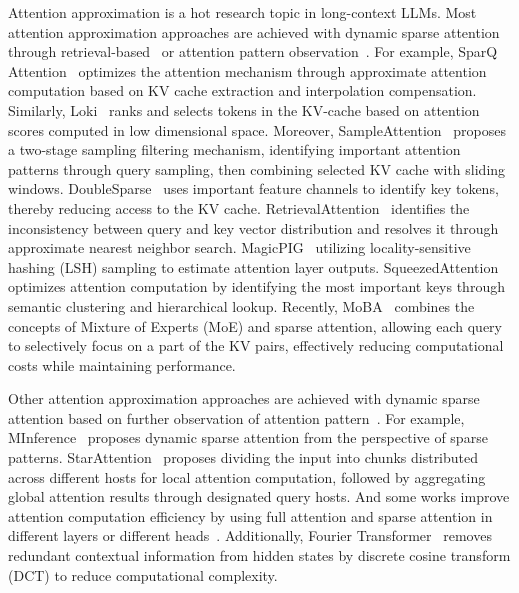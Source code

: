 Attention approximation is a hot research topic in long-context LLMs. Most attention approximation approaches are achieved with dynamic sparse attention through retrieval-based~\citep{ribar2023sparq,liu2024retrievalattention} or attention pattern observation~\citep{jiang2024minference}. For example, SparQ Attention~\citep{ribar2023sparq} optimizes the attention mechanism through approximate attention computation based on KV cache extraction and interpolation compensation. Similarly, Loki~\citep{singhania2024loki} ranks and selects tokens in the KV-cache based on attention scores computed in low dimensional space. Moreover, SampleAttention~\citep{zhu2024sampleattention} proposes a two-stage sampling filtering mechanism, identifying important attention patterns through query sampling, then combining selected KV cache with sliding windows. DoubleSparse~\citep{yang2024post} uses important feature channels to identify key tokens, thereby reducing access to the KV cache. RetrievalAttention~\citep{liu2024retrievalattention} identifies the inconsistency between query and key vector distribution and resolves it through approximate nearest neighbor search. MagicPIG~\citep{chen2024magicpig} utilizing locality-sensitive hashing (LSH) sampling to estimate attention layer outputs. SqueezedAttention~\citep{hooper2024squeezed} optimizes attention computation by identifying the most important keys through semantic clustering and hierarchical lookup. Recently, MoBA~\citep{lu2025mobamixtureblockattention} combines the concepts of Mixture of Experts (MoE) and sparse attention, allowing each query to selectively focus on a part of the KV pairs, effectively reducing computational costs while maintaining performance.

Other attention approximation approaches are achieved with dynamic sparse attention based on further observation of attention pattern~\citep{jiang2024minference}. For example,
MInference~\citep{jiang2024minference} proposes dynamic sparse attention from the perspective of sparse patterns. StarAttention~\citep{acharya2024star} proposes dividing the input into chunks distributed across different hosts for local attention computation, followed by aggregating global attention results through designated query hosts. And some works improve attention computation efficiency by using full attention and sparse attention in different layers or different heads~\citep{beltagy2020longformer,li2019big,ainslie2020etc}. Additionally, Fourier Transformer~\citep{he2023fourier} removes redundant contextual information from hidden states by discrete cosine transform (DCT) to reduce computational complexity. 


